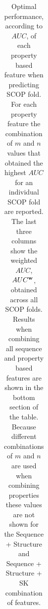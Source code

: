 \begin{table}[h]
{\begin{tabular}{|l||rrc|rrc|rrc|rrc||rrc||}
		\hline
		
	\end{tabular}
}
\caption[Optimal property based feature performance when predicting SCOP fold.]{Optimal performance, according to $AUC$, of each property based feature when predicting SCOP fold.  For each property feature the combination of $m$ and $n$ values that obtained the highest $AUC$ for an individual SCOP fold are reported.  The last three columns show the weighted $AUC$, $AUC^{\bf{w}}$, obtained across all SCOP folds. Results when combining all sequence and property based features are shown in the bottom section of the table.  Because different combinations of $m$ and $n$ are used when combining properties these values are not shown for the Sequence + Structure and Sequence + Structure + SK combination of features.}
\label{tab:vqscopt}
\end{table}
